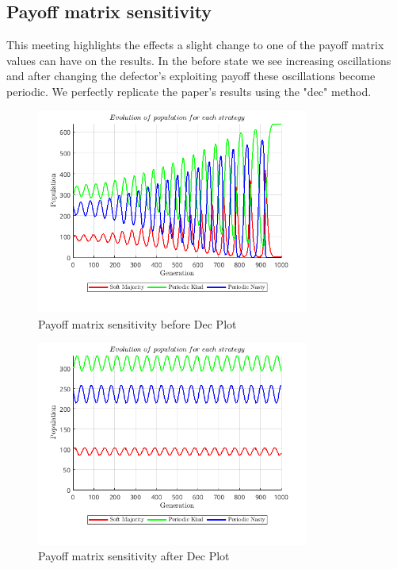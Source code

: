 \documentclass[12pt]{article}
\begin{document}
\subsection{Payoff matrix sensitivity}
This meeting highlights the effects a slight change to one of the payoff matrix values can have on the results. In the before state we see increasing oscillations and after changing the defector's exploiting payoff these oscillations become periodic. We perfectly replicate the paper's results using the "dec" method. 
\begin{figure}[H]
    \centering
    \includegraphics[width=0.8\textwidth]{media/payoff_matrix_sensitivity_before_dec.png}
    \caption{Payoff matrix sensitivity before Dec Plot}
\end{figure}
\begin{figure}[H]
    \centering
    \includegraphics[width=0.8\textwidth]{media/payoff_matrix_sensitivity_after_dec.png}
    \caption{Payoff matrix sensitivity after Dec Plot}
\end{figure}
\end{document}
